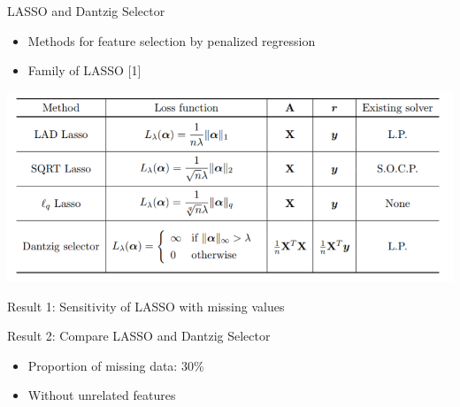 \documentclass[ignorenonframetext,]{beamer}
\providecommand{\tightlist}{%
  \setlength{\itemsep}{0pt}\setlength{\parskip}{0pt}}
\begin{document}
\begin{frame}{LASSO and Dantzig Selector}

\begin{itemize}
\item
  Methods for feature selection by penalized regression
\item
  Family of LASSO {[}1{]}
\end{itemize}

\includegraphics[width=0.8\linewidth]{dantzig_table}

\end{frame}

\begin{frame}{Result 1: Sensitivity of LASSO with missing values}

\end{frame}

\begin{frame}{}

\end{frame}

\begin{frame}{}

\end{frame}

\begin{frame}{}

\end{frame}

\begin{frame}{Result 2: Compare LASSO and Dantzig Selector}

\begin{itemize}
\tightlist
\item
  Proportion of missing data: 30\%
\item
  Without unrelated features
\end{itemize}

\end{frame}

\begin{frame}{}

\end{frame}
\end{document}
